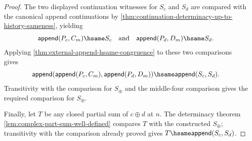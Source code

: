 \begin{proof}
The two displayed continuation witnesses for $S_c$ and $S_d$ are compared with the canonical append continuations by \autoref{thm:continuation-determinacy-up-to-history-sameness}, yielding
$$
\mathsf{append}(P_c,C_m)\hsame S_c
\quad\text{and}\quad
\mathsf{append}(P_d,D_m)\hsame S_d.
$$
Applying \autoref{thm:external-append-hsame-congruence} to these two comparisons gives
$$
\mathsf{append}(\mathsf{append}(P_c,C_m),\mathsf{append}(P_d,D_m))
\hsame
\mathsf{append}(S_c,S_d).
$$
Transitivity with the comparison for $S_\oplus$ and the middle-four comparison gives the required comparison for $S_\oplus$.

Finally, let $T$ be any closed partial sum of $c\oplus d$ at $n$. The determinacy theorem \autoref{lem:complex-part-sum-well-defined} compares $T$ with the constructed $S_\oplus$; transitivity with the comparison already proved gives $T\hsame\mathsf{append}(S_c,S_d)$.
\end{proof}

